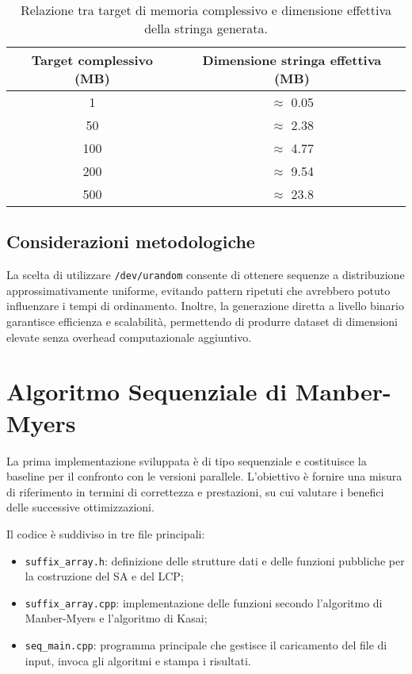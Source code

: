 			\begin{table}[H]
				\centering
				\begin{tabular}{|c|c|}
					\hline
					\textbf{Target complessivo (MB)} & \textbf{Dimensione stringa effettiva (MB)} \\
					\hline
					1                                     & $\approx$ 0.05                             \\
					50                                    & $\approx$ 2.38                             \\
					100                                   & $\approx$ 4.77                             \\
					200                                   & $\approx$ 9.54                             \\
					500                                   & $\approx$ 23.8                             \\
					\hline
				\end{tabular}
				\caption{Relazione tra target di memoria complessivo e dimensione effettiva della stringa generata.}
				\label{tab:random_strings_sizes}
			\end{table}
		
		\subsection{Considerazioni metodologiche}
			La scelta di utilizzare \texttt{/dev/urandom} consente di ottenere sequenze a distribuzione approssimativamente uniforme, evitando pattern ripetuti che avrebbero potuto influenzare i tempi di ordinamento.
			Inoltre, la generazione diretta a livello binario garantisce efficienza e scalabilità, permettendo di produrre dataset di dimensioni elevate senza overhead computazionale aggiuntivo.
	
	\section{Algoritmo Sequenziale di Manber-Myers}
		La prima implementazione sviluppata è di tipo sequenziale e costituisce la baseline per il confronto con le versioni parallele.
		L'obiettivo è fornire una misura di riferimento in termini di correttezza e prestazioni, su cui valutare i benefici delle successive ottimizzazioni.
		
		Il codice è suddiviso in tre file principali:
		\begin{itemize}
			\item \texttt{suffix\_array.h}: definizione delle strutture dati e delle funzioni pubbliche per la costruzione del SA e del LCP;
			\item \texttt{suffix\_array.cpp}: implementazione delle funzioni secondo l'algoritmo di Manber-Myers e l'algoritmo di Kasai;
			\item \texttt{seq\_main.cpp}: programma principale che gestisce il caricamento del file di input, invoca gli algoritmi e stampa i risultati.
		\end{itemize}
		
